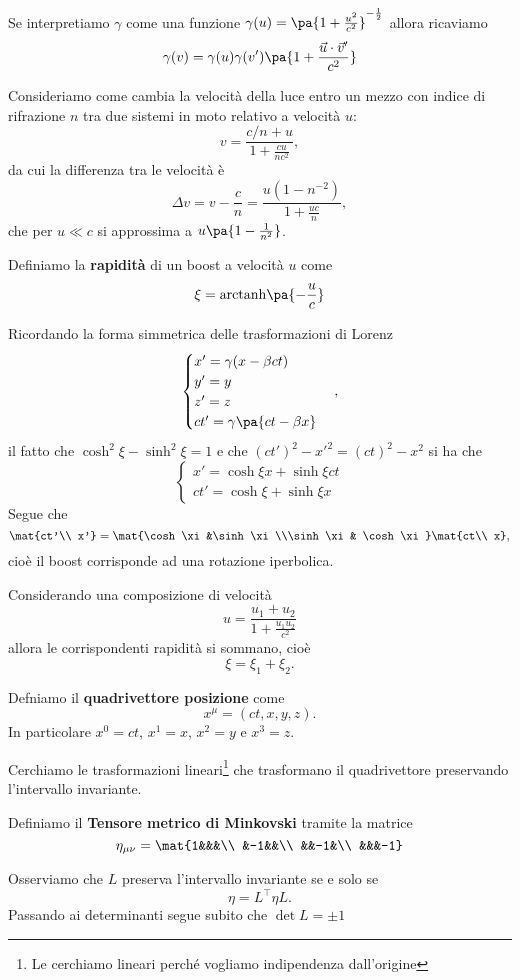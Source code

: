 \begin{remark}
Se interpretiamo $\gamma$ come una funzione $\gamma(u)=\pa{1+\frac{u^2}{c^2}}^{-\frac12}$ allora ricaviamo
\[\gamma(v)=\gamma(u)\gamma(v')\pa{1+\frac{\vec u\cdot \vec v'}{c^2}}\]
\end{remark}


\begin{example}
Consideriamo come cambia la velocit\`a della luce entro un mezzo con indice di rifrazione $n$ tra due sistemi in moto relativo a velocit\`a $u$:
\[v=\frac{c/n+u}{1+\frac{cu}{nc^2}},\]
da cui la differenza tra le velocit\`a \`e
\[\Delta v=v-\frac cn=\frac{u(1-n^{-2})}{1+\frac{uc}n},\]
che per $u\ll c$ si approssima a $u\pa{1-\frac1{n^2}}$.
\end{example}

\begin{definition}[Rapidit\`a]
Definiamo la \textbf{rapidit\`a} di un boost a velocit\`a $u$ come
\[\xi=\mathrm{arctanh}\pa{-\frac uc}\]
\end{definition}
\noindent
Ricordando la forma simmetrica delle trasformazioni di Lorenz
\[\begin{cases}
x'=\gamma (x-\beta ct)\\
y'=y\\
z'=z\\
ct'=\gamma\pa{ct-\beta x}
\end{cases},\]
il fatto che $\cosh^2\xi-\sinh^2\xi=1$ e che $(ct')^2-x'^2=(ct)^2-x^2$ si ha che
\[\begin{cases}
x'=\cosh\xi x+\sinh\xi ct\\
ct'=\cosh \xi +\sinh\xi x
\end{cases}\]
Segue che
\[\mat{ct'\\ x'}=\mat{\cosh \xi &\sinh \xi\\\sinh \xi & \cosh \xi}\mat{ct\\ x},\]
cio\`e il boost corrisponde ad una rotazione iperbolica.

\begin{remark}
Considerando una composizione di velocit\`a 
\[u=\dfrac{u_1+u_2}{1+\frac{u_1u_2}{c^2}}\]
allora le corrispondenti rapidit\`a si sommano, cio\`e
\[\xi=\xi_1+\xi_2.\]
\end{remark}


\begin{definition}[Quadrivettore]
Defniamo il \textbf{quadrivettore posizione} come
\[x^\mu=(ct,x,y,z).\]
In particolare $x^0=ct$, $x^1=x$, $x^2=y$ e $x^3=z$.
\end{definition}

Cerchiamo le trasformazioni lineari\footnote{Le cerchiamo lineari perch\'e vogliamo indipendenza dall'origine} che trasformano il quadrivettore preservando l'intervallo invariante.

\begin{definition}
Definiamo il \textbf{Tensore metrico di Minkovski} tramite la matrice
\[\eta_{\mu\nu}=\mat{1&&&\\
&-1&&\\
&&-1&\\
&&&-1}\]
\end{definition}
Osserviamo che $L$ preserva l'intervallo invariante se e solo se
\[\eta=L^\top\eta L.\]
Passando ai determinanti segue subito che $\det L=\pm 1$
